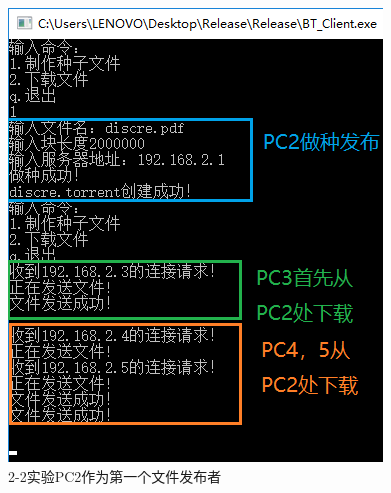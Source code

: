 \documentclass[thesis]{thesis}
\begin{document}
	\begin{minipage}{0.5\linewidth}
	\begin{figure}[H]
		\centering
		\includegraphics[width=\linewidth]{fig/PC2_22.png}
		\caption{2-2实验\quad PC2作为第一个文件发布者}
		\label{res:PC2_22}
	\end{figure}
	\end{minipage}
\end{document}
